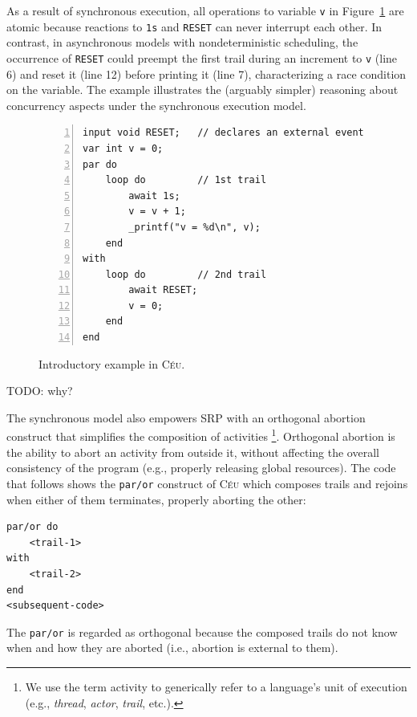 \documentclass{acm_proc_article-sp}
\newcommand{\CEU}{\textsc{C\'{e}u}\xspace}
\newcommand{\code}[1] {{\small{\texttt{#1}}}}
\newcommand{\1}{\;}
\newcommand{\2}{\;\;}
\newcommand{\3}{\;\;\;}
\newcommand{\5}{\;\;\;\;\;}
\begin{document}
As a result of synchronous execution, all operations to variable \code{v} in 
Figure~\ref{lst.intro} are atomic because reactions to \code{1s} and 
\code{RESET} can never interrupt each other.
%
In contrast, in asynchronous models with nondeterministic scheduling, the 
occurrence of \code{RESET} could preempt the first trail during an increment to 
\code{v} (line 6) and reset it (line 12) before printing it (line 7), 
characterizing a race condition on the variable.
%
The example illustrates the (arguably simpler) reasoning about concurrency 
aspects under the synchronous execution model.

\begin{figure}[t]
\begin{lstlisting}[numbers=left,xleftmargin=3em]
input void RESET;   // declares an external event
var int v = 0;
par do
    loop do         // 1st trail
        await 1s;
        v = v + 1;
        _printf("v = %d\n", v);
    end
with
    loop do         // 2nd trail
        await RESET;
        v = 0;
    end
end
\end{lstlisting}
\caption{ Introductory example in \CEU.
\label{lst.intro}
}
\end{figure}


TODO: why?

The synchronous model also empowers SRP with an orthogonal abortion construct 
that simplifies the composition of activities%
\footnote{We use the term activity to generically refer to a language's unit of 
execution (e.g., \emph{thread}, \emph{actor}, \emph{trail}, etc.).}.
%
Orthogonal abortion is the ability to abort an activity from outside it, 
without affecting the overall consistency of the program (e.g., properly 
releasing global resources).
%
The code that follows shows the \code{par/or} construct of \CEU which composes 
trails and rejoins when either of them terminates, properly aborting the other:

\begin{lstlisting}
par/or do
    <trail-1>
with
    <trail-2>
end
<subsequent-code>
\end{lstlisting}

The \code{par/or} is regarded as orthogonal because the composed trails do not 
know when and how they are aborted (i.e., abortion is external to them).
%
\end{document}

